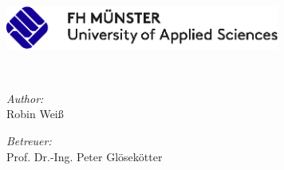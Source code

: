 
\begin{titlepage}
	\begin{center}
        \large  

        \hfill

        \vfill
        
        \includegraphics[width=9cm]{Figures/Logo-FH-Muenster} \\ \medskip
        
        \myDepartment
        
        \vfill

        \begingroup
            \color{Maroon}\spacedallcaps{\Large\myTitle} \\ \bigskip
        \endgroup

        \spacedlowsmallcaps{\myName}
        
        \vfill
        
        \begin{minipage}{0.4\textwidth}
			\begin{flushleft}
			\emph{Author:} \\
			Robin Wei\ss{}
			\end{flushleft}
			\end{minipage}
			\hfill
			\begin{minipage}{0.5\textwidth}
			\begin{flushright}
			\emph{Betreuer:} \\
			Prof. Dr.-Ing. Peter Glösekötter
			\end{flushright}
		\end{minipage}

        
        \vfill
        
        \textit{\mySubtitle} \\
            
        \vfill              
        
        \myTime   
        
        \vfill  

	\end{center}     
\end{titlepage}   